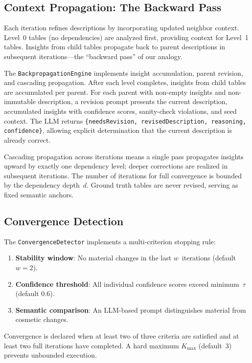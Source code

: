 \documentclass[sigconf, nonacm]{acmart}
\begin{document}
\subsection{Context Propagation: The Backward Pass}

Each iteration refines descriptions by incorporating updated neighbor context. Level~0 tables (no dependencies) are analyzed first, providing context for Level~1 tables. Insights from child tables propagate back to parent descriptions in subsequent iterations---the ``backward pass'' of our analogy.

The \texttt{BackpropagationEngine} implements insight accumulation, parent revision, and cascading propagation. After each level completes, insights from child tables are accumulated per parent. For each parent with non-empty insights and non-immutable description, a revision prompt presents the current description, accumulated insights with confidence scores, sanity-check violations, and seed context. The LLM returns \texttt{\{needsRevision, revisedDescription, reasoning, confidence\}}, allowing explicit determination that the current description is already correct.

Cascading propagation across iterations means a single pass propagates insights upward by exactly one dependency level; deeper corrections are realized in subsequent iterations. The number of iterations for full convergence is bounded by the dependency depth~$d$. Ground truth tables are never revised, serving as fixed semantic anchors.

\subsection{Convergence Detection}

The \texttt{ConvergenceDetector} implements a multi-criterion stopping rule:

\begin{enumerate}
    \item \textbf{Stability window}: No material changes in the last $w$~iterations (default $w = 2$).
    \item \textbf{Confidence threshold}: All individual confidence scores exceed minimum~$\tau$ (default 0.6).
    \item \textbf{Semantic comparison}: An LLM-based prompt distinguishes material from cosmetic changes.
\end{enumerate}

Convergence is declared when at least two of three criteria are satisfied and at least two full iterations have completed. A hard maximum $K_{\max}$ (default~3) prevents unbounded execution.
\end{document}
